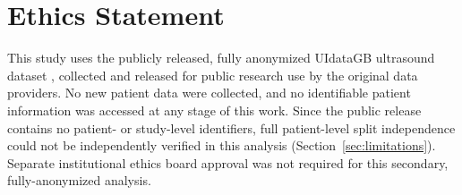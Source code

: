\section*{Ethics Statement}
This study uses the publicly released, fully anonymized UIdataGB ultrasound dataset \cite{ref17}, collected and released for public research use by the original data providers. No new patient data were collected, and no identifiable patient information was accessed at any stage of this work. Since the public release contains no patient- or study-level identifiers, full patient-level split independence could not be independently verified in this analysis (Section~\ref{sec:limitations}). Separate institutional ethics board approval was not required for this secondary, fully-anonymized analysis.
